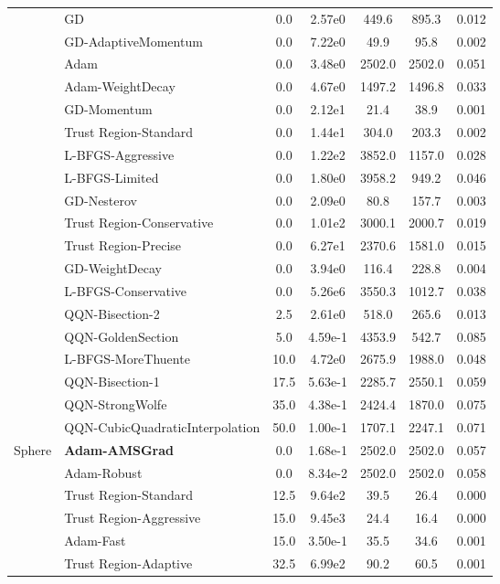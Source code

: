 \documentclass{article}
\begin{document}
\begin{table}[htbp]
{\begin{tabular}{p{2.5cm}p{2.5cm}*{5}{c}}
 & GD & 0.0 & 2.57e0 & 449.6 & 895.3 & 0.012 \\
 & GD-AdaptiveMomentum & 0.0 & 7.22e0 & 49.9 & 95.8 & 0.002 \\
 & Adam & 0.0 & 3.48e0 & 2502.0 & 2502.0 & 0.051 \\
 & Adam-WeightDecay & 0.0 & 4.67e0 & 1497.2 & 1496.8 & 0.033 \\
 & GD-Momentum & 0.0 & 2.12e1 & 21.4 & 38.9 & 0.001 \\
 & Trust Region-Standard & 0.0 & 1.44e1 & 304.0 & 203.3 & 0.002 \\
 & L-BFGS-Aggressive & 0.0 & 1.22e2 & 3852.0 & 1157.0 & 0.028 \\
 & L-BFGS-Limited & 0.0 & 1.80e0 & 3958.2 & 949.2 & 0.046 \\
 & GD-Nesterov & 0.0 & 2.09e0 & 80.8 & 157.7 & 0.003 \\
 & Trust Region-Conservative & 0.0 & 1.01e2 & 3000.1 & 2000.7 & 0.019 \\
 & Trust Region-Precise & 0.0 & 6.27e1 & 2370.6 & 1581.0 & 0.015 \\
 & GD-WeightDecay & 0.0 & 3.94e0 & 116.4 & 228.8 & 0.004 \\
 & L-BFGS-Conservative & 0.0 & 5.26e6 & 3550.3 & 1012.7 & 0.038 \\
 & QQN-Bisection-2 & 2.5 & 2.61e0 & 518.0 & 265.6 & 0.013 \\
 & QQN-GoldenSection & 5.0 & 4.59e-1 & 4353.9 & 542.7 & 0.085 \\
 & L-BFGS-MoreThuente & 10.0 & 4.72e0 & 2675.9 & 1988.0 & 0.048 \\
 & QQN-Bisection-1 & 17.5 & 5.63e-1 & 2285.7 & 2550.1 & 0.059 \\
 & QQN-StrongWolfe & 35.0 & 4.38e-1 & 2424.4 & 1870.0 & 0.075 \\
 & QQN-CubicQuadraticInterpolation & 50.0 & 1.00e-1 & 1707.1 & 2247.1 & 0.071 \\
\midrule
\multirow{25}{*}{Sphere} & \textbf{Adam-AMSGrad} & 0.0 & 1.68e-1 & 2502.0 & 2502.0 & 0.057 \\
 & Adam-Robust & 0.0 & 8.34e-2 & 2502.0 & 2502.0 & 0.058 \\
 & Trust Region-Standard & 12.5 & 9.64e2 & 39.5 & 26.4 & 0.000 \\
 & Trust Region-Aggressive & 15.0 & 9.45e3 & 24.4 & 16.4 & 0.000 \\
 & Adam-Fast & 15.0 & 3.50e-1 & 35.5 & 34.6 & 0.001 \\
 & Trust Region-Adaptive & 32.5 & 6.99e2 & 90.2 & 60.5 & 0.001 \\

\end{tabular}}
\end{table}
\end{document}

